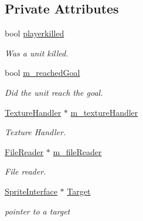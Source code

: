 \subsection*{Private Attributes}
\begin{DoxyCompactItemize}
\item 
\mbox{\label{class_scene_a8d7c43876336f52c76a288532e681c7c}} 
bool \mbox{\hyperlink{class_scene_a8d7c43876336f52c76a288532e681c7c}{playerkilled}}
\begin{DoxyCompactList}\small\item\em Was a unit killed. \end{DoxyCompactList}\item 
\mbox{\label{class_scene_a5d79aa70e9ac8b5851ad8c28d5629c35}} 
bool \mbox{\hyperlink{class_scene_a5d79aa70e9ac8b5851ad8c28d5629c35}{m\+\_\+reached\+Goal}}
\begin{DoxyCompactList}\small\item\em Did the unit reach the goal. \end{DoxyCompactList}\item 
\mbox{\label{class_scene_a70a2c4620c467044155309b945fe4c33}} 
\mbox{\hyperlink{class_texture_handler}{Texture\+Handler}} $\ast$ \mbox{\hyperlink{class_scene_a70a2c4620c467044155309b945fe4c33}{m\+\_\+texture\+Handler}}
\begin{DoxyCompactList}\small\item\em Texture Handler. \end{DoxyCompactList}\item 
\mbox{\label{class_scene_a3736d22281ac82fd3a16f434487442d3}} 
\mbox{\hyperlink{class_file_reader}{File\+Reader}} $\ast$ \mbox{\hyperlink{class_scene_a3736d22281ac82fd3a16f434487442d3}{m\+\_\+file\+Reader}}
\begin{DoxyCompactList}\small\item\em File reader. \end{DoxyCompactList}\item 
\mbox{\label{class_scene_a2191f78a6e675382488cdaca6e371c32}} 
\mbox{\hyperlink{class_sprite_interface}{Sprite\+Interface}} $\ast$ \mbox{\hyperlink{class_scene_a2191f78a6e675382488cdaca6e371c32}{Target}}
\begin{DoxyCompactList}\small\item\em pointer to a target \end{DoxyCompactList}\item 

\end{DoxyCompactItemize}
